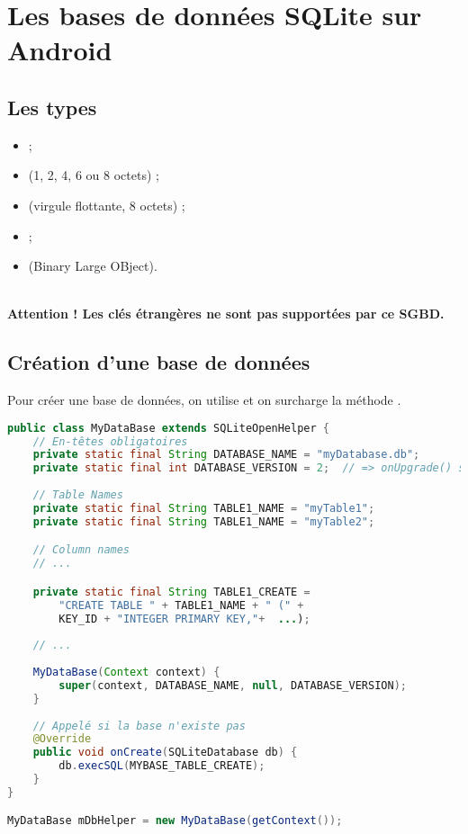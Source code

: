 \section{Les bases de données SQLite sur Android}
\subsection{Les types}

\begin{itemize}
    \item {} ;
    \item {} (1, 2, 4, 6 ou 8 octets) ;
    \item {} (virgule flottante, 8 octets) ;
    \item {} ;
    \item {} (Binary Large OBject).
\end{itemize}

\noindent\\ \textbf{Attention ! Les clés étrangères ne sont pas supportées par ce SGBD.}

\subsection{Création d'une base de données}
Pour créer une base de données, on utilise  et on surcharge la méthode .

\begin{lstlisting}[language=java]
public class MyDataBase extends SQLiteOpenHelper {
    // En-têtes obligatoires
    private static final String DATABASE_NAME = "myDatabase.db";
    private static final int DATABASE_VERSION = 2;  // => onUpgrade() si la base n'est à jour.
    
    // Table Names
    private static final String TABLE1_NAME = "myTable1";
    private static final String TABLE1_NAME = "myTable2";

    // Column names
    // ...

    private static final String TABLE1_CREATE =
        "CREATE TABLE " + TABLE1_NAME + " (" +
        KEY_ID + "INTEGER PRIMARY KEY,"+  ...);
        
    // ...
    
    MyDataBase(Context context) {
        super(context, DATABASE_NAME, null, DATABASE_VERSION);
    }
    
    // Appelé si la base n'existe pas
    @Override
    public void onCreate(SQLiteDatabase db) {
        db.execSQL(MYBASE_TABLE_CREATE);
    }
}

MyDataBase mDbHelper = new MyDataBase(getContext());
\end{lstlisting}


